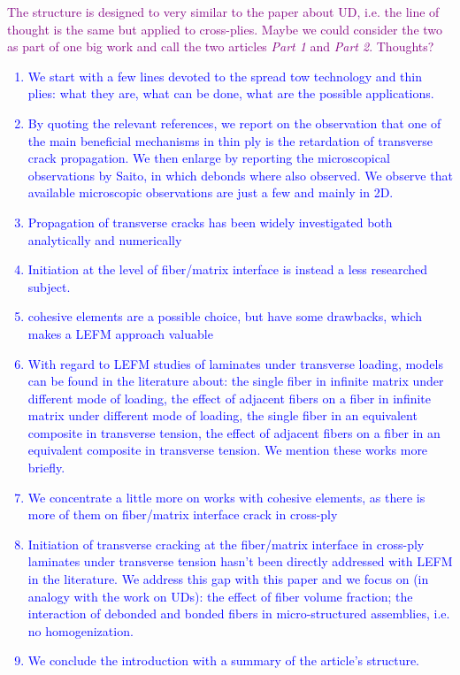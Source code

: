 \documentclass[review]{elsarticle}
\begin{document}
\textcolor{purple}{The structure is designed to very similar to the paper about UD, i.e. the line of thought is the same but applied to cross-plies. Maybe we could consider the two as part of one big work and call the two articles \emph{Part 1} and \emph{Part 2}. Thoughts?}\\

\textcolor{blue}{
\begin{enumerate}
\item We start with a few lines devoted to the spread tow technology and thin plies: what they are, what can be done, what are the possible applications.
\item By quoting the relevant references, we report on the observation that one of the main beneficial mechanisms in thin ply is the retardation of transverse crack propagation. We then enlarge by reporting the microscopical observations by Saito, in which debonds where also observed. We observe that available microscopic observations are just a few and mainly in 2D.
\item Propagation of transverse cracks has been widely investigated both analytically and numerically
\item Initiation at the level of fiber/matrix interface is instead a less researched subject.
\item cohesive elements are a possible choice, but have some drawbacks, which makes a LEFM approach valuable
\item With regard to LEFM studies of laminates under transverse loading, models can be found in the literature about: the single fiber in infinite matrix under different mode of loading, the effect of adjacent fibers on a fiber in infinite matrix under different mode of loading, the single fiber in an equivalent composite in transverse tension, the effect of adjacent fibers on a fiber in an equivalent composite in transverse tension. We mention these works more briefly.
\item We concentrate a little more on works with cohesive elements, as there is more of them on fiber/matrix interface crack in cross-ply
\item Initiation of transverse cracking at the fiber/matrix interface in cross-ply laminates under transverse tension hasn't been directly addressed with LEFM in the literature. We address this gap with this paper and we focus on (in analogy with the work on UDs): the effect of fiber volume fraction; the interaction of debonded and bonded fibers in micro-structured assemblies, i.e. no homogenization.
\item We conclude the introduction with a summary of the article's structure.
\end{enumerate}
}
\end{document}
